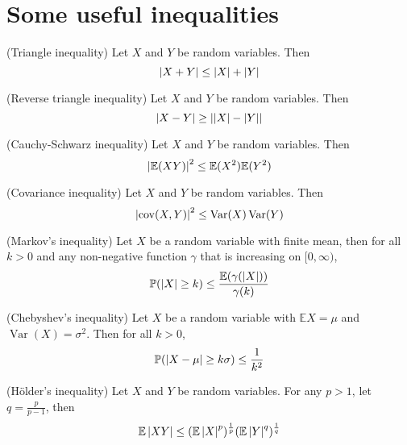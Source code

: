 \documentclass{huhtakm-template-book}
\newcommand{\prob}{\mathbb{P}}
\newcommand{\expect}{\mathbb{E}}
\DeclareMathOperator{\Var}{Var}
\DeclareMathOperator{\cov}{cov}
\begin{document}
\chapter{Some useful inequalities}
\begin{thm}(Triangle inequality)
	Let $X$ and $Y$ be random variables. Then
	\begin{equation*}
		\left|{X+Y}\right|\leq\left|{X}\right|+\left|{Y}\right|
	\end{equation*}
\end{thm}
\begin{thm}(Reverse triangle inequality)
	Let $X$ and $Y$ be random variables. Then
	\begin{equation*}
		\left|{X-Y}\right|\geq\left|{\left|{X}\right|-\left|{Y}\right|}\right|
	\end{equation*}
\end{thm}
\begin{thm}(Cauchy-Schwarz inequality)
	Let $X$ and $Y$ be random variables. Then
	\begin{equation*}
		\abs{\expect(XY)}^{2}\leq\expect(X^{2})\expect(Y^{2})
	\end{equation*}
\end{thm}
\begin{thm}(Covariance inequality)
	Let $X$ and $Y$ be random variables. Then
	\begin{equation*}
		\abs{\cov(X,Y)}^{2}\leq\Var(X)\Var(Y)
	\end{equation*}
\end{thm}
\begin{thm}(Markov's inequality)
	Let $X$ be a random variable with finite mean, then for all $k>0$ and any non-negative function $\gamma$ that is increasing on $[0,\infty)$,
	\begin{equation*}
		\prob(\abs{X}\geq k)\leq\frac{\expect(\gamma(\abs{X}))}{\gamma(k)}
	\end{equation*}
\end{thm}
\begin{thm}(Chebyshev's inequality)
	Let $X$ be a random variable with $\expect X=\mu$ and $\Var(X)=\sigma^{2}$. Then for all $k>0$,
	\begin{equation*}
		\prob(\abs{X-\mu}\geq k\sigma)\leq\frac{1}{k^{2}}
	\end{equation*}
\end{thm}
\begin{thm}(H\"older's inequality)
	Let $X$ and $Y$ be random variables. For any $p>1$, let $q=\frac{p}{p-1}$, then
	\begin{equation*}
		\expect\abs{XY}\leq(\expect\abs{X}^{p})^{\frac{1}{p}}(\expect\abs{Y}^{q})^{\frac{1}{q}}
	\end{equation*}
\end{thm}
\end{document}
